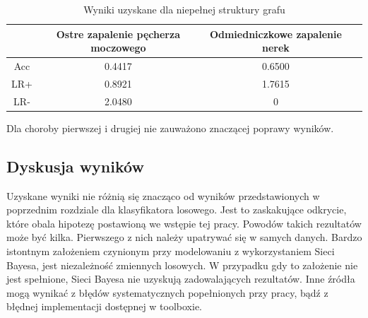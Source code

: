 \documentclass{article}
\begin{document}
\begin{table}[H]
\caption{Wyniki uzyskane dla niepełnej struktury grafu}
\label{results not full}
\centering
\begin{tabular}{|c|c|c|c|}
  \hline 
   & Ostre zapalenie pęcherza moczowego & Odmiedniczkowe zapalenie nerek \\
  \hline
  Acc & 0.4417 & 0.6500 \\
  \hline
  LR+ & 0.8921 & 1.7615 \\
  \hline
  LR- & 2.0480 & 0 \\
  \hline
\end{tabular}
\end{table}

Dla choroby pierwszej i drugiej nie zauważono znaczącej poprawy wyników.

\subsection{Dyskusja wyników}

Uzyskane wyniki nie różnią się znacząco od wyników przedstawionych w poprzednim rozdziale dla klasyfikatora losowego. Jest to zaskakujące odkrycie, które obala hipotezę postawioną we wstępie tej pracy. Powodów takich rezultatów może być kilka. Pierwszego z nich należy upatrywać się w samych danych. Bardzo istontnym założeniem czynionym przy modelowaniu z wykorzystaniem Sieci Bayesa, jest niezależność zmiennych losowych. W przypadku gdy to założenie nie jest spełnione, Sieci Bayesa nie uzyskują zadowalających rezultatów. Inne źródła mogą wynikać z błędów systematycznych popełnionych przy pracy, bądź z błędnej implementacji dostępnej w toolboxie.
\end{document}

